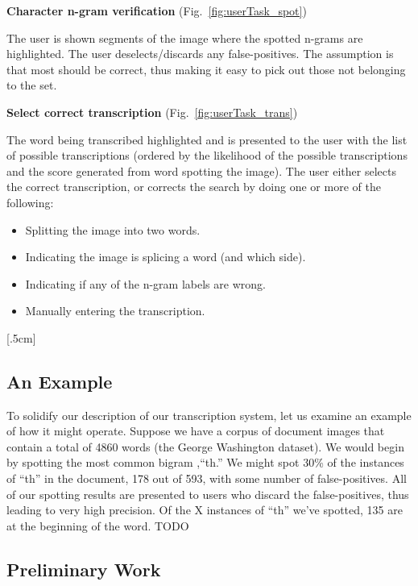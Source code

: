 \documentclass[ms]{byuprop}
\begin{document}
{\setlength{\parindent}{0cm}
\textbf{Character n-gram verification} (Fig.~\ref{fig:userTask_spot})

\begin{addmargin}[3em]{3em}
The user is shown segments of the image where the spotted n-grams are highlighted. The user deselects/discards any false-positives. The assumption is that most should be correct, thus making it easy to pick out those not belonging to the set.
\\[.5cm]
\end{addmargin}


\textbf{Select correct transcription} (Fig.~\ref{fig:userTask_trans})

\begin{addmargin}[3em]{3em}
The word being transcribed highlighted and is presented to the user with the list of possible transcriptions (ordered by the likelihood of the possible transcriptions and the score generated from word spotting the image). The user either selects the correct transcription, or corrects the search by doing one or more of the following:
\begin{itemize}
    \item Splitting the image into two words.
    \item Indicating the image is splicing a word (and which side).
    \item Indicating if any of the n-gram labels are wrong.
    \item Manually entering the transcription.
\end{itemize}
[.5cm]
\end{addmargin}
}



\subsection{An Example}
To solidify our description of our transcription system, let us examine an example of how it might operate. Suppose we have a corpus of document images that contain a total of 4860 words (the George Washington dataset). We would begin by spotting the most common bigram ,``th.'' We might spot 30\% of the instances of ``th'' in the document, 178 out of 593, with some number of false-positives. All of our spotting results are presented to users who discard the false-positives, thus leading to very high precision. Of the X instances of ``th'' we've spotted, 135 are at the beginning of the word. TODO

\subsection{Preliminary Work}
\end{document}
